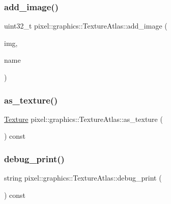 \subsubsection{\texorpdfstring{add\+\_\+image()}{add\_image()}\hspace{0.1cm}{\footnotesize\ttfamily [3/3]}}
{\footnotesize\ttfamily uint32\+\_\+t pixel\+::graphics\+::\+Texture\+Atlas\+::add\+\_\+image (\begin{DoxyParamCaption}\item[{const \hyperlink{structpixel_1_1graphics_1_1_image_data}{Image\+Data} \&}]{img,  }\item[{const string \&}]{name }\end{DoxyParamCaption})}

\mbox{\label{classpixel_1_1graphics_1_1_texture_atlas_af54a81d380abe7a8faec3e148215f9c4}} 
\subsubsection{\texorpdfstring{as\+\_\+texture()}{as\_texture()}}
{\footnotesize\ttfamily \hyperlink{classpixel_1_1graphics_1_1_texture}{Texture} pixel\+::graphics\+::\+Texture\+Atlas\+::as\+\_\+texture (\begin{DoxyParamCaption}{ }\end{DoxyParamCaption}) const}

\mbox{\label{classpixel_1_1graphics_1_1_texture_atlas_abd450c2c9d3b37d750dcf797eeb5f315}} 
\subsubsection{\texorpdfstring{debug\+\_\+print()}{debug\_print()}}
{\footnotesize\ttfamily string pixel\+::graphics\+::\+Texture\+Atlas\+::debug\+\_\+print (\begin{DoxyParamCaption}{ }\end{DoxyParamCaption}) const}

